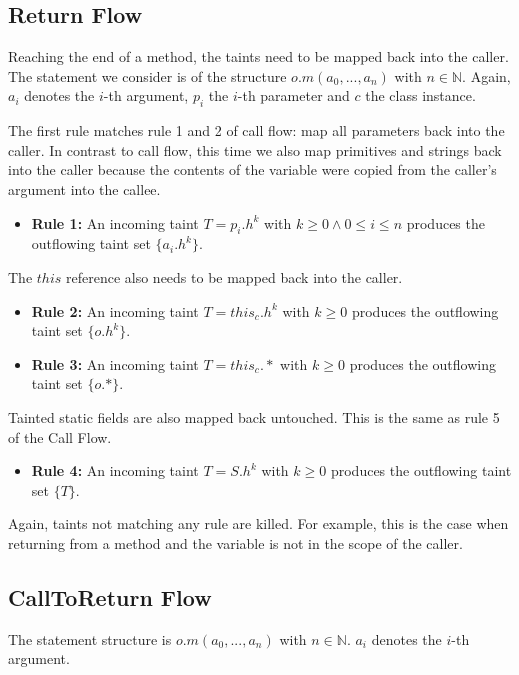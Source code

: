 \documentclass[../draft.tex]{subfiles}
\begin{document}
    \subsection{Return Flow}
    Reaching the end of a method, the taints need to be mapped back into the caller. The statement we consider is of the structure $o.m(a_0, ..., a_n)$ with $n \in \mathbb{N}$. Again, $a_i$ denotes the $i$-th argument, $p_i$ the $i$-th parameter and $c$ the class instance.

    The first rule matches rule 1 and 2 of call flow: map all parameters back into the caller. In contrast to call flow, this time we also map primitives and strings back into the caller because the contents of the variable were copied from the caller's argument into the callee.
    \begin{itemize}
        \item[] \textbf{Rule 1:} An incoming taint $T = p_i.h^k$ with $k \geq 0 \land 0 \leq i \leq n$ produces the outflowing taint set $\{a_i.h^k\}$.
    \end{itemize}

    The $\mathit{this}$ reference also needs to be mapped back into the caller.
    \begin{itemize}
        \item[] \textbf{Rule 2:} An incoming taint $T = \mathit{this}_c.h^k$ with $k \geq 0$ produces the outflowing taint set $\{o.h^k\}$. 
        \item[] \textbf{Rule 3:} An incoming taint $T = \mathit{this}_c.*$ with $k \geq 0$ produces the outflowing taint set $\{o.*\}$.
    \end{itemize}
    
    Tainted static fields are also mapped back untouched. This is the same as rule 5 of the Call Flow.
    \begin{itemize}
        \item[] \textbf{Rule 4:} An incoming taint $T = S.h^k$ with $k \geq 0$ produces the outflowing taint set $\{T\}$. 
    \end{itemize}
    
    Again, taints not matching any rule are killed. For example, this is the case when returning from a method and the variable is not in the scope of the caller.

    \subsection{CallToReturn Flow}
    The statement structure is $o.m(a_0, ..., a_n)$ with $n \in \mathbb{N}$. $a_i$ denotes the $i$-th argument.
\end{document}
